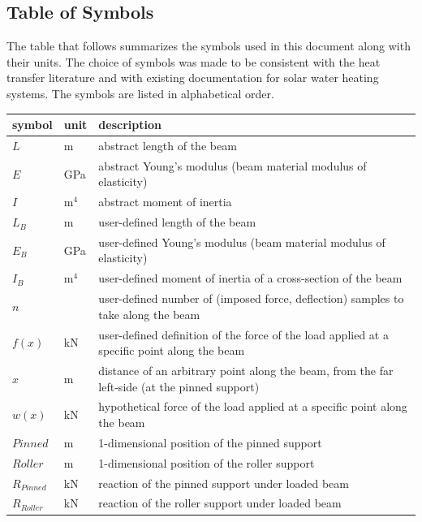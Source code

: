 \documentclass[12pt]{article}
\begin{document}
\subsection{Table of Symbols}

The table that follows summarizes the symbols used in this document along with
their units.  The choice of symbols was made to be consistent with the heat
transfer literature and with existing documentation for solar water heating
systems.  The symbols are listed in alphabetical order.

\renewcommand{\arraystretch}{1.2}
\noindent
\begin{longtable*}{l l p{12cm}}
    \toprule
    \textbf{symbol} & \textbf{unit} & \textbf{description}\\
    \midrule
    \(L\) & \si{\metre} & abstract length of the beam \\
    \(E\) & \si{\giga\pascal} & abstract Young's modulus (beam material modulus of elasticity) \\
    \(I\) & \(\si{\metre{}}^{4}\) & abstract moment of inertia \\
    \(L_{B}\) & \si{\metre} & user-defined length of the beam \\
    \(E_{B}\) & \si{\giga\pascal} & user-defined Young's modulus (beam material modulus of elasticity) \\
    \(I_{B}\) & \(\si{\metre{}}^{4}\) & user-defined moment of inertia of a cross-section of the beam \\
    \(n\) & \textemdash{} & user-defined number of (imposed force, deflection) samples to take along the beam \\
    \(f(x)\) & \si{\kilo\newton} & user-defined definition of the force of the load applied at a specific point along the beam \\
    \(x\) & \si{\metre} & distance of an arbitrary point along the beam, from the far left-side (at the pinned support) \\
    \(w(x)\) & \si{\kilo\newton} & hypothetical force of the load applied at a specific point along the beam \\
    \(\mathit{Pinned}\) & \si{\metre} & 1-dimensional position of the pinned support \\
    \(\mathit{Roller}\) & \si{\metre} & 1-dimensional position of the roller support \\
    \(R_{\mathit{Pinned}}\) & \si{\kilo\newton} & reaction of the pinned support under loaded beam \\
    \(R_{\mathit{Roller}}\) & \si{\kilo\newton} & reaction of the roller support under loaded beam \\

\end{longtable*}
\end{document}
